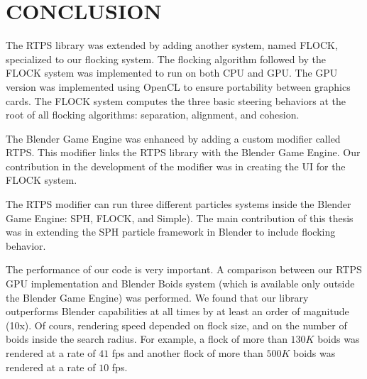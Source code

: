 \chapter{CONCLUSION}\label{conclusionChapter}


The RTPS library was extended by adding another system, named FLOCK, specialized to our flocking system. 
The flocking algorithm followed by the FLOCK system was implemented to run on both CPU and GPU. The GPU version was implemented using OpenCL to ensure portability between graphics cards. The FLOCK system computes the three basic steering behaviors at the root of all flocking algorithms: separation, alignment, and cohesion. 

The Blender Game Engine was enhanced by adding a custom modifier called RTPS. This modifier links the RTPS library with the Blender Game Engine. Our contribution in the development of the modifier was in creating the UI for the FLOCK system.

The RTPS modifier can run three different particles systems inside the Blender Game Engine: SPH, FLOCK, and Simple). The main contribution of this thesis was in extending the SPH particle framework in Blender to include flocking behavior.   %

The performance of our code is very important. A comparison between our RTPS GPU implementation and Blender Boids system (which is available only outside the Blender Game Engine) was performed. We found that our library outperforms Blender capabilities at all times by at least an order of magnitude (10x). Of cours, rendering speed depended on flock size, and on the number of boids inside the search radius. For example, a flock of more than $130K$ boids was rendered at a rate of $41$ fps and another flock of more than $500K$ boids was rendered at a rate of $10$ fps. 
